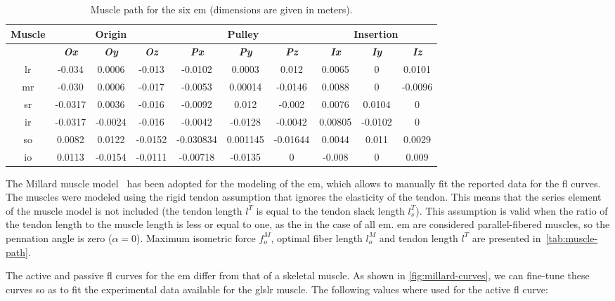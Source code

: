 \documentclass[11pt,a4paper,draft=false]{report}
\begin{document}
\begin{table}[ht]
  \caption{Muscle path for the six \gls{em} (dimensions are given in
    meters).}\label{tab:muscle-path}
  \begin{tabular}{@{}cccccccccc@{}}
    \toprule
    \textbf{Muscle}
    & \multicolumn{3}{c}{\textbf{Origin}}
    & \multicolumn{3}{c}{\textbf{Pulley}}
    & \multicolumn{3}{c}{\textbf{Insertion}} \\
    \midrule
    & \textit{\textbf{Ox}} & \textit{\textbf{Oy}} & \textit{\textbf{Oz}}
    & \textit{\textbf{Px}} & \textit{\textbf{Py}} & \textit{\textbf{Pz}}
    & \textit{\textbf{Ix}} & \textit{\textbf{Iy}} & \textit{\textbf{Iz}} \\
    \midrule
    \gls{lr} & -0.034 & 0.0006 & -0.013 & -0.0102 & 0.0003 & 0.012 & 0.0065 & 0 & 0.0101 \\
    \gls{mr} & -0.030 & 0.0006 & -0.017 & -0.0053 & 0.00014 & -0.0146 & 0.0088 & 0 & -0.0096 \\
    \gls{sr} & -0.0317 & 0.0036 & -0.016 & -0.0092 & 0.012 & -0.002 & 0.0076 & 0.0104 & 0 \\
    \gls{ir} & -0.0317 & -0.0024 & -0.016 & -0.0042 & -0.0128 & -0.0042 & 0.00805 & -0.0102 & 0 \\
    \gls{so} & 0.0082 & 0.0122 & -0.0152 & -0.030834 & 0.001145 & -0.01644 & 0.0044 & 0.011 & 0.0029 \\
    \gls{io} & 0.0113 & -0.0154 & -0.0111 & -0.00718 & -0.0135 & 0 & -0.008 & 0 & 0.009 \\
    \bottomrule
  \end{tabular}
\end{table}

The Millard muscle model~\cite{Millard2013} has been adopted for the modeling of
the \gls{em}, which allows to manually fit the reported data for the \gls{fl}
curves. The muscles were modeled using the rigid tendon assumption that ignores
the elasticity of the tendon. This means that the series element of the muscle
model is not included (the tendon length $l^T$ is equal to the tendon slack
length $l_s^T$). This assumption is valid when the ratio of the tendon length to
the muscle length is less or equal to one, as the in the case of all
\gls{em}. \gls{em} are considered parallel-fibered muscles, so the pennation
angle is zero ($\alpha = 0$). Maximum isometric force $f_o^M$, optimal fiber
length $l_o^M$ and tendon length $l^T$ are presented
in~\autoref{tab:muscle-path}.

The active and passive \gls{fl} curves for the \gls{em} differ from that of a
skeletal muscle. As shown in \autoref{fig:millard-curves}, we can fine-tune
these curves so as to fit the experimental data available for the gls{lr}
muscle. The following values where used for the active \gls{fl} curve:
\end{document}
